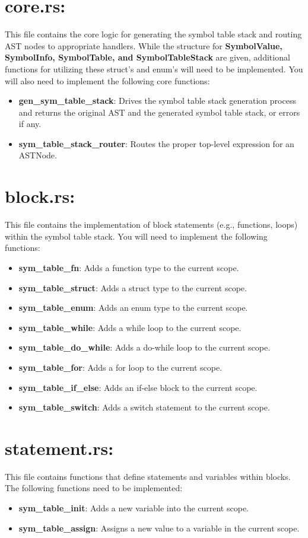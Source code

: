 \documentclass[
	12pt, %
]{fphw}
\begin{document}
\section*{core.rs:}
This file contains the core logic for generating the symbol table stack and routing AST nodes to appropriate handlers. While the structure for \textbf{SymbolValue, SymbolInfo, SymbolTable, and SymbolTableStack} are given, additional functions for utilizing these struct's and enum's will need to be implemented. You will also need to implement the following core functions:
\begin{itemize}
    \item \textbf{gen\_sym\_table\_stack}: Drives the symbol table stack generation process and returns the original AST and the generated symbol table stack, or errors if any.
    \item \textbf{sym\_table\_stack\_router}: Routes the proper top-level expression for an ASTNode.
\end{itemize}

\section*{block.rs:}
This file contains the implementation of block statements (e.g., functions, loops) within the symbol table stack. You will need to implement the following functions:
\begin{itemize}
    \item \textbf{sym\_table\_fn}: Adds a function type to the current scope.
    \item \textbf{sym\_table\_struct}: Adds a struct type to the current scope.
    \item \textbf{sym\_table\_enum}: Adds an enum type to the current scope.
    \item \textbf{sym\_table\_while}: Adds a while loop to the current scope.
    \item \textbf{sym\_table\_do\_while}: Adds a do-while loop to the current scope.
    \item \textbf{sym\_table\_for}: Adds a for loop to the current scope.
    \item \textbf{sym\_table\_if\_else}: Adds an if-else block to the current scope.
    \item \textbf{sym\_table\_switch}: Adds a switch statement to the current scope.
\end{itemize}
\pagebreak
\section*{statement.rs:}
This file contains functions that define statements and variables within blocks. The following functions need to be implemented:
\begin{itemize}
    \item \textbf{sym\_table\_init}: Adds a new variable into the current scope.
    \item \textbf{sym\_table\_assign}: Assigns a new value to a variable in the current scope.
\end{itemize}
\end{document}
